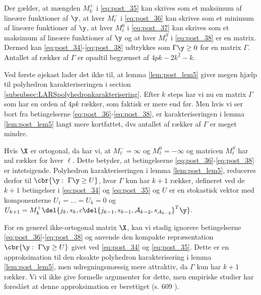 \begin{lem}
Der gælder, at mængden \(M_k^+\) i \eqref{eq:post_35} kan skrives som et maksimum af lineære funktioner af \(\y\), at hver \(M_\ell^-\) i \eqref{eq:post_36} kan skrives som et minimum af lineære funktioner af \(\y\), at hver \(M_\ell^0\) i \eqref{eq:post_37} kan skrives som et maksimum af lineære funktioner af \(\y\) og at hver \(M_\ell^S\) i \eqref{eq:post_38} er en matrix.
Dermed kan \eqref{eq:post_34}-\eqref{eq:post_38} udtrykkes som \(\Gamma \y \geq 0\) for en matrix \(\Gamma\).
Antallet af rækker af \(\Gamma\) er opadtil begrænset af \(4pk - 2 k^2 -k\).
\end{lem}
%
Ved første øjekast lader det ikke til, at lemma \ref{lem:post_lem5} giver megen hjælp til polyhedron karakteriseringen i section \ref{subsubsec:LARSpolyhedronkarakterisering}.
Efter \(k\) steps har vi nu en matrix \(\Gamma\) som har en orden af \(4pk\) rækker, som faktisk er mere end før.
Men hvis vi ser bort fra betingelserne \eqref{eq:post_36}-\eqref{eq:post_38}, er karakteriseringen i lemma \ref{lem:post_lem5} langt mere kortfattet, dvs antallet af rækker af \(\Gamma\) er meget mindre.

Hvis \(\X\) er ortogonal, da har vi, at \(M_\ell^-= \infty\) og \(M_\ell^0=-\infty\) og matricen \(M_\ell^S\) har nul rækker for hver \(\ell\).
Dette betyder, at betingelserne \eqref{eq:post_36}-\eqref{eq:post_38} er intetsigende.
Polyhedron karakteriseringen i lemma \ref{lem:post_lem5}, reduceres derfor til \(\cbr{\y: \ \Gamma \y \geq U}\), hvor \(\Gamma\) kun har \(k+1\) rækker, defineret ved de \(k+1\) betingelser i \eqref{eq:post_34} og \eqref{eq:post_35} og \(U\) er en stokastisk vektor med komponenterne \(U_1 = \dots = U_k=0\) og \(U_{k+1}= M_k^+ \del{j_k,s_k, c \del{j_{k-1}, s_{k-1}, \mathcal{A}_{k-2}, s_{\mathcal{A}_{k-2}}}^T \y}\).

For en generel ikke-ortogonal matrix \(\X\), kan vi stadig ignorere betingelserne \eqref{eq:post_36}-\eqref{eq:post_38} og anvende den kompakte repræsentation \(\cbr{\y: \ \Gamma \y \geq U}\) givet ved \eqref{eq:post_34} og \eqref{eq:post_35}.
Dette er en approksimation til den eksakte polyhedron karakterisering i lemma \ref{lem:post_lem5}, men udregningsmæssig mere attraktiv, da \(\Gamma\) kun har \(k+1\) rækker.
Vi vil ikke give formelle argumenter for dette, men empiriske studier har foreslået at denne approksimation er berettiget (s. 609 \citep{post_inference}).

